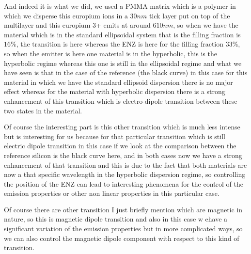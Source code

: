 \documentclass[../main/main.tex]{subfiles}
\begin{document}
And indeed it is what we did, we used a PMMA matrix which is a polymer in which we disperse this europium ions in a $30 nm$ tick layer put on top of the multilayer and this europium 3+ emits at around $610 nm$, so when we have the material which is in the standard ellipsoidal system that is the filling fraction is $16\%$, the transition is here whereas the ENZ is here for the filling fraction $33\%$, so when the emitter is here one material is in the hyperbolic, this is the hyperbolic regime whereas this one is still in the ellipsoidal regime and what we have seen is that in the case of the reference (the black curve) in this case for this material in which we have the standard ellipsoid dispersion there is no major effect whereas for the material with hyperbolic dispersion there is a strong enhancement of this transition which is electro-dipole transition between these two states in the material.

Of course the interesting part is this other transition which is much less intense but is interesting for us because for that particular transition which is still electric dipole transition in this case if we look at the comparison between the reference silicon is the black curve here, and in both cases now we have a strong enhancement of that transition and this is due to the fact that both materials are now a  that specific wavelength in the hyperbolic dispersion regime, so controlling the position of the ENZ can lead to interesting phenomena for the control of the emission properties or other non linear properties in this particular case.

Of course there are other transition I just briefly mention which are magnetic in nature, so this is magnetic dipole transition and also in this case w ehave a significant variation of the emission properties but in more complicated ways, so we can also control the magnetic dipole component with respect to this kind of transition.
\end{document}
